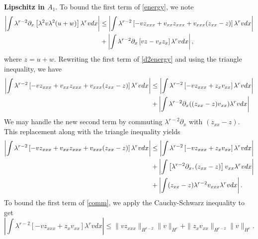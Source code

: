 \documentclass[reqno]{amsart}
\theoremstyle{plain}
\numberwithin{equation}{section}
\begin{document}
\noindent \textbf{Lipschitz in $A_1$}. To bound the first term of \eqref{energy}, we note  
\begin{align}
\notag    \left| \int \lambda^{r-2}\partial_x\left[\lambda^2v\lambda^2(u+w)\right] \lambda^{r}vdx\right|
        &\leq \left| \int \lambda^{r-2}\left[-vz_{xxx} + v_{xx}z_{xxx} + v_{xxx}(z_{xx}-z)\right]\lambda^{r}vdx\right|
            \\&+ \left| \int \lambda^{r-2}\partial_x\left[vz - v_xz_x\right]\lambda^{r}vdx\right|,\label{d2energy}
\end{align}
where $z = u + w.$
Rewriting the first term of \eqref{d2energy} and using the triangle inequality, we have
    \begin{align}
         \notag \left| \int \lambda^{r-2}\left[-vz_{xxx} + v_{xx}z_{xxx} + v_{xxx}(z_{xx}-z)\right]\lambda^{r}vdx\right|
         & \leq \left|\int \lambda^{r-2}\left[-vz_{xxx} + z_xv_{xx}\right]\lambda^{r}vdx\right| 
            \\ & + \left| \int \lambda^{r-2} \partial_x((z_{xx}-z)v_{xx})\lambda^{r}vdx\right|
            \label{split}
    \end{align} 
We may handle the new second term by commuting $\lambda^{r-2}\partial_x$ with $(z_{xx}-z)$.
This replacement along with the triangle inequality yields   
    \begin{align}
    \notag    \left| \int \lambda^{r-2}\left[-vz_{xxx} + v_{xx}z_{xxx} + v_{xxx}(z_{xx}-z)\right]\lambda^{r}vdx\right|
            &\leq \left|\int \lambda^{r-2}\left[-vz_{xxx} + z_xv_{xx}\right]\lambda^{r}vdx\right|   
            \\ 
            \notag &+ \left| \int \left[\lambda^{r-2} \partial_x, (z_{xx}-z)\right]v_{xx}\lambda^{r}vdx \right|
            \\ &+ \left| \int (z_{xx}-z)\lambda^{r-2} v_{xxx}\lambda^{r}vdx \right|.\label{comm}
    \end{align} 
To bound the first term of \eqref{comm}, we apply the Cauchy-Schwarz inequality to get
\begin{equation}\label{cs2}
    \left|\int \lambda^{r-2}\left[-vz_{xxx} + z_xv_{xx}\right]\lambda^{r}vdx\right|  
         \leq \|vz_{xxx}\|_{H^{r-2}}\|v\|_{H^r} 
            + \|z_xv_{xx}\|_{H^{r-2}}\|v\|_{H^r}.
\end{equation}
\end{document}
